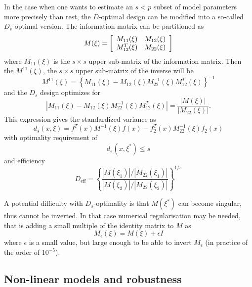 \documentclass[12pt]{iopart}
\begin{document}
In the case when one wants to estimate an $s < p$ subset of model parameters more precisely than rest, the $D$-optimal design can be modified into a so-called $D_s$-optimal version. The information matrix can be partitioned as
\begin{equation}
M(\xi) = \left[
  \begin{array}{l l}
    M_{11}(\xi)   & M_{12}(\xi)\\
    M^T_{12}(\xi) & M_{22}(\xi)
  \end{array} \right]
\end{equation}
where $M_{11}(\xi)$ is the $s \times s$ upper sub-matrix of the information matrix. Then the $M^{11}(\xi)$, the $s \times s$ upper sub-matrix of the inverse will be
\begin{equation}
M^{11}(\xi) = \left\{M_{11}(\xi) - M_{12}(\xi)M^{-1}_{22}(\xi)M^T_{12}(\xi)\right\}^{-1}
\end{equation}
and the $D_s$ design optimizes for 
\begin{equation}
|M_{11}(\xi) - M_{12}(\xi)M^{-1}_{22}(\xi)M^T_{12}(\xi)| = \frac{|M(\xi)|}{|M_{22}(\xi)|}.
\end{equation}
This expression gives the standardized variance as
\begin{equation}
d_s(x, \xi) = f^T(x) M^{-1}(\xi)f(x) - f_2^T(x) M_{22}^{-1}(\xi)f_2(x)
\label{eq:dsvar}
\end{equation}
with optimality requirement of
\begin{equation}
d_s(x, \xi^*) \leq s
\end{equation}
and efficiency
\begin{equation}
D_\mathrm{eff} = \left\{\frac{|M(\xi_1)|/|M_{22}(\xi_1)|}{|M(\xi_2)|/|M_{22}(\xi_2)|}\right\}^{1/s}
\end{equation}

A potential difficulty with $D_s$-optimality is that $M(\xi^*)$ can become singular, thus cannot be inverted. In that case numerical regularisation may be needed, that is adding a small multiple of the identity matrix to $M$ as
\begin{equation}
M_\epsilon(\xi) = M(\xi)  + \epsilon I
\end{equation}  
where $\epsilon$ is a small value, but large enough to be able to invert $M_\epsilon$ (in practice of the order of $10^{-5}$).

\subsection{Non-linear models and robustness}
\end{document}
